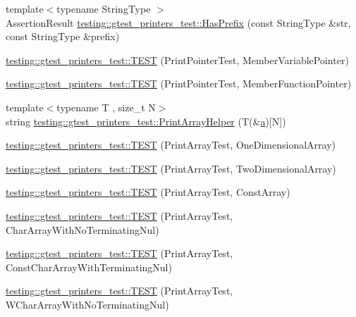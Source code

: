 \begin{DoxyCompactItemize}
\item 
{\footnotesize template$<$typename String\+Type $>$ }\\Assertion\+Result \hyperlink{namespacetesting_1_1gtest__printers__test_abbd436200da6c80944c8a7504fb56ea1}{testing\+::gtest\+\_\+printers\+\_\+test\+::\+Has\+Prefix} (const String\+Type \&str, const String\+Type \&prefix)
\item 
\hyperlink{namespacetesting_1_1gtest__printers__test_a434cafcc1dbee409992bbb1593034480}{testing\+::gtest\+\_\+printers\+\_\+test\+::\+T\+E\+ST} (Print\+Pointer\+Test, Member\+Variable\+Pointer)
\item 
\hyperlink{namespacetesting_1_1gtest__printers__test_a9d998b210890d3d7e085d01c457f650f}{testing\+::gtest\+\_\+printers\+\_\+test\+::\+T\+E\+ST} (Print\+Pointer\+Test, Member\+Function\+Pointer)
\item 
{\footnotesize template$<$typename T , size\+\_\+t N$>$ }\\string \hyperlink{namespacetesting_1_1gtest__printers__test_a10300ded1e327c98c6a36beb7ad49e58}{testing\+::gtest\+\_\+printers\+\_\+test\+::\+Print\+Array\+Helper} (T(\&\hyperlink{_07copy_08_2_read_camera_model_8m_a551a3d351eadcc0b9b1a2f24f0fb5ea0}{a})\mbox{[}N\mbox{]})
\item 
\hyperlink{namespacetesting_1_1gtest__printers__test_a3845c4717b03cb5ad309c7d9a37acb0a}{testing\+::gtest\+\_\+printers\+\_\+test\+::\+T\+E\+ST} (Print\+Array\+Test, One\+Dimensional\+Array)
\item 
\hyperlink{namespacetesting_1_1gtest__printers__test_ac366b9ec749b2499d21583d3b8f86273}{testing\+::gtest\+\_\+printers\+\_\+test\+::\+T\+E\+ST} (Print\+Array\+Test, Two\+Dimensional\+Array)
\item 
\hyperlink{namespacetesting_1_1gtest__printers__test_a8b5638f178c12f58707ca0f02a3b4d41}{testing\+::gtest\+\_\+printers\+\_\+test\+::\+T\+E\+ST} (Print\+Array\+Test, Const\+Array)
\item 
\hyperlink{namespacetesting_1_1gtest__printers__test_a3bae023a42049745b49fa1f2db9a0cb2}{testing\+::gtest\+\_\+printers\+\_\+test\+::\+T\+E\+ST} (Print\+Array\+Test, Char\+Array\+With\+No\+Terminating\+Nul)
\item 
\hyperlink{namespacetesting_1_1gtest__printers__test_ab51b9ecaca7d635326101b23d5e8afd2}{testing\+::gtest\+\_\+printers\+\_\+test\+::\+T\+E\+ST} (Print\+Array\+Test, Const\+Char\+Array\+With\+Terminating\+Nul)
\item 
\hyperlink{namespacetesting_1_1gtest__printers__test_ac19ec2732031bfe83b30ea9f00259ef3}{testing\+::gtest\+\_\+printers\+\_\+test\+::\+T\+E\+ST} (Print\+Array\+Test, W\+Char\+Array\+With\+No\+Terminating\+Nul)

\end{DoxyCompactItemize}
